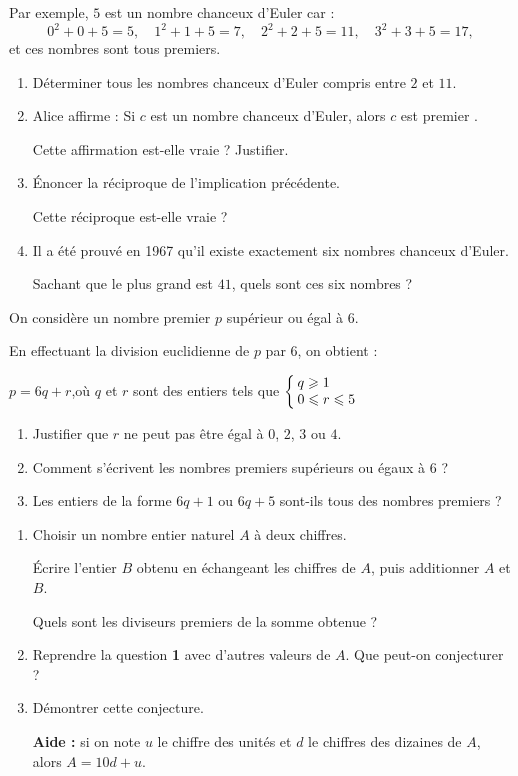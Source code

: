 Par exemple, $5$ est un nombre chanceux d'Euler car :
\[0^2+0+5=5,\quad 1^2+1+5=7,\quad 2^2+2+5=11,\quad 3^2+3+5=17,\]
et ces nombres sont tous premiers.

\begin{enumerate}
\item Déterminer tous les nombres chanceux d'Euler compris entre $2$ et $11$.
\item Alice affirme : \og Si $c$ est un nombre chanceux d'Euler, alors $c$ est premier \fg{}.

Cette affirmation est-elle vraie ? Justifier.
\item Énoncer la réciproque de l'implication précédente.

Cette réciproque est-elle vraie ?
\item Il a été prouvé en 1967 qu'il existe exactement six nombres chanceux d'Euler.

Sachant que le plus grand est $41$, quels sont ces six nombres ?
\end{enumerate}

\exo

On considère un nombre premier $p$ supérieur ou égal à $6$.

En effectuant la division euclidienne de $p$ par $6$, on obtient :
\begin{center}
$p=6q+r$,\quad où $q$ et $r$ sont des entiers tels que $\left\{\setlength\arraycolsep{2pt}\begin{array}{l}
q\geqslant 1 \\
0\leqslant r\leqslant 5
\end{array}\right.$
\end{center}
\begin{enumerate}
\item Justifier que $r$ ne peut pas être égal à $0$, $2$, $3$ ou $4$.
\item Comment s'écrivent les nombres premiers supérieurs ou égaux à $6$ ?
\item Les entiers de la forme $6q+1$ ou $6q+5$ sont-ils tous des nombres premiers ?
\end{enumerate}

\exo

\begin{enumerate}
\item Choisir un nombre entier naturel $A$ à deux chiffres.

Écrire l'entier $B$ obtenu en échangeant les chiffres de $A$, puis additionner $A$ et $B$.

Quels sont les diviseurs premiers de la somme obtenue ?
\item Reprendre la question \textbf{1} avec d'autres valeurs de $A$. Que peut-on conjecturer ?
\item Démontrer cette conjecture.

\textbf{Aide : } si on note $u$ le chiffre des unités et $d$ le chiffres des dizaines de $A$, alors $A=10d+u$.
\end{enumerate}

